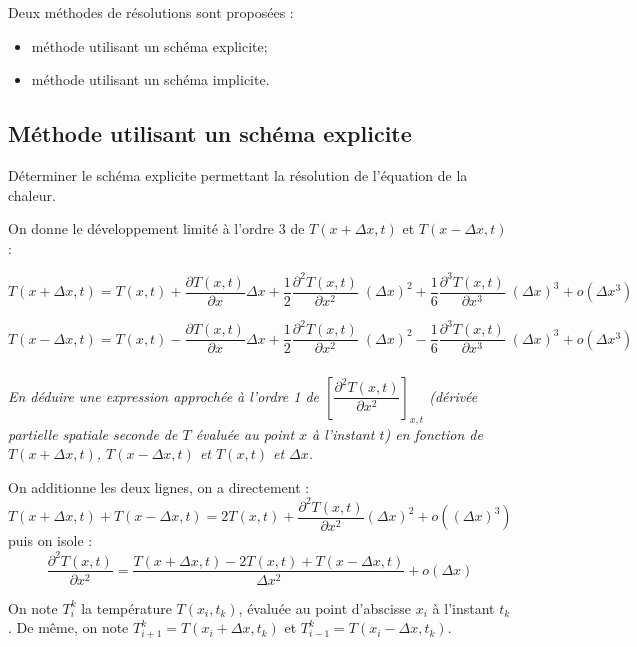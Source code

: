 \documentclass[10pt,fleqn]{article} %
\begin{document}
\begin{multicols}{2}
\noindent
Deux méthodes de résolutions sont proposées : 
\begin{itemize}
\item méthode utilisant un schéma explicite;
\item méthode utilisant un schéma implicite.
\end{itemize}
\fi

\subsection*{Méthode utilisant un schéma explicite}
\ifprof
\else
\begin{obj}
Déterminer le schéma explicite permettant la résolution de l'équation de la chaleur.
\end{obj}

On donne le développement limité à l'ordre 3 de $T(x+\Delta x,t)$ et $T(x-\Delta x,t)$ :

$
T(x+\Delta x,t)=T(x,t)+\dfrac{\partial T(x,t)}{\partial x}\Delta x  
+ \dfrac{1}{2}\dfrac{\partial^2 T(x,t)}{\partial x^2} \;\left( \Delta x\right)^2 
+ \dfrac{1}{6}\dfrac{\partial^3 T(x,t)}{\partial x^3} \;\left( \Delta x\right)^3 
+ o\left( \Delta x^3\right)
$

$
T(x-\Delta x,t)=T(x,t)-\dfrac{\partial T(x,t)}{\partial x}\Delta x 
+ \dfrac{1}{2}\dfrac{\partial^2 T(x,t)}{\partial x^2} \;\left( \Delta x\right)^2 
- \dfrac{1}{6}\dfrac{\partial^3 T(x,t)}{\partial x^3}\;\left( \Delta x\right)^3 
+ o\left( \Delta x^3\right)
$
\fi

\subparagraph{}\textit{En déduire une expression approchée à l'ordre 1 de
 $\left[\dfrac{\partial^2 T(x,t)}{\partial x^2}\right]_{x,t}$ (dérivée partielle spatiale seconde de 
 $T$ évaluée au point $x$ à l'instant $t$) en fonction de $T(x+\Delta x,t)$, $T(x-\Delta x,t)$ et 
$T(x,t)$ et $\Delta x$.}
\ifprof
\begin{corrige}
On additionne les deux lignes, on a directement :
$$
T(x+\Delta x,t)+T(x-\Delta x,t)=2T(x,t)
+ \dfrac{\partial^2 T(x,t)}{\partial x^2}(\Delta x)^2
+o((\Delta x)^3)$$
puis on isole : 
$$
\dfrac{\partial^2 T(x,t)}{\partial x^2} 
=
\dfrac{T(x+\Delta x,t)-2T(x,t) + T(x-\Delta x,t)}{\Delta x^2 }+ o\left(\Delta x\right)
$$
\end{corrige}

\else
\fi

\vspace{.5cm}

On note $T_i^k$ la température $T\left(x_i,t_k\right)$, évaluée au point d'abscisse $x_i$ à
 l'instant $t_k$. De même, on note $T_{i+1}^k=T\left(x_i + \Delta x,t_k \right)$ et 
$T_{i-1}^k=T\left(x_i - \Delta x,t_k \right)$.


\end{multicols}
\end{document}

